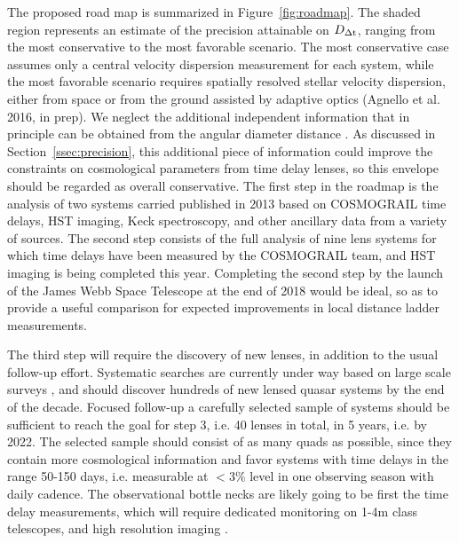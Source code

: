 The proposed road map is summarized in Figure~\ref{fig:roadmap}. The
shaded region represents an estimate of the precision attainable on
$D_{\Delta{\rm t}}$, ranging from the most conservative to the most favorable
scenario. The most conservative case assumes only a central velocity
dispersion measurement for each system, while the most favorable
scenario requires spatially resolved stellar velocity dispersion,
either from space or from the ground assisted by adaptive optics
(Agnello et al. 2016, in prep). We neglect the additional independent
information that in principle can be obtained from the angular
diameter distance \citep{JeeKomatsuSuyu2015,JeeEtal2016}.  As
discussed in Section~\ref{ssec:precision}, this additional piece of
information could improve the constraints on cosmological parameters
from time delay lenses, so this envelope should be regarded as overall
conservative. The first step in the roadmap is the analysis of two
systems carried published in 2013 based on COSMOGRAIL time delays, HST
imaging, Keck spectroscopy, and other ancillary data from a variety of
sources. The second step consists of the full analysis of nine lens
systems for which time delays have been measured by the COSMOGRAIL
team, and HST imaging is being completed this year. Completing the
second step by the launch of the James Webb Space Telescope at the end
of 2018 would be ideal, so as to provide a useful comparison for
expected improvements in local distance ladder measurements.

The third step will require the discovery of new lenses, in addition
to the usual follow-up effort. Systematic searches are currently under
way based on large scale surveys \citep{Agn++15,Mor++16}, and should
discover hundreds of new lensed quasar systems \citep{O+M10} by the
end of the decade. Focused follow-up a carefully selected sample of
systems should be sufficient to reach the goal for step 3, i.e. 40
lenses in total, in 5 years, i.e. by 2022. The selected sample should
consist of as many quads as possible, since they contain more
cosmological information and favor systems with time delays in the
range 50-150 days, i.e. measurable at $<3\%$ level in one observing
season with daily cadence. The observational bottle necks are likely
going to be first the time delay measurements, which will require
dedicated monitoring on 1-4m class telescopes, and high resolution
imaging \citep{Tre++13}.


